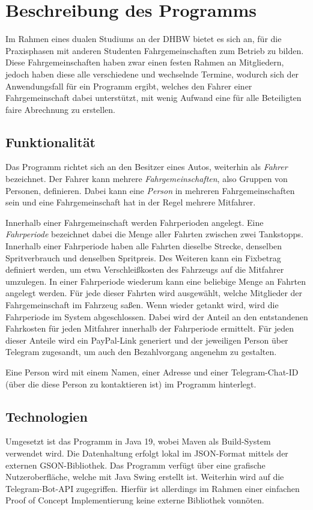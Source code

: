 \chapter{Beschreibung des Programms}
Im Rahmen eines dualen Studiums an der DHBW bietet es sich an, für die Praxisphasen mit anderen Studenten Fahrgemeinschaften zum Betrieb zu bilden.
Diese Fahrgemeinschaften haben zwar einen festen Rahmen an Mitgliedern, jedoch haben diese alle verschiedene und wechselnde Termine, wodurch sich der Anwendungsfall für ein Programm ergibt, welches den Fahrer einer Fahrgemeinschaft dabei unterstützt, mit wenig Aufwand eine für alle Beteiligten faire Abrechnung zu erstellen.

\section{Funktionalität}
\label{sec:funktionalität}
Das Programm richtet sich an den Besitzer eines Autos, weiterhin als \emph{Fahrer} bezeichnet.
Der Fahrer kann mehrere \emph{Fahrgemeinschaften}, also Gruppen von Personen, definieren.
Dabei kann eine \emph{Person} in mehreren Fahrgemeinschaften sein und eine Fahrgemeinschaft hat in der Regel mehrere Mitfahrer.

Innerhalb einer Fahrgemeinschaft werden Fahrperioden angelegt.
Eine \emph{Fahrperiode} bezeichnet dabei die Menge aller Fahrten zwischen zwei Tankstopps.
Innerhalb einer Fahrperiode haben alle Fahrten dieselbe Strecke, denselben Spritverbrauch und denselben Spritpreis.
Des Weiteren kann ein Fixbetrag definiert werden, um etwa Verschleißkosten des Fahrzeugs auf die Mitfahrer umzulegen.
In einer Fahrperiode wiederum kann eine beliebige Menge an Fahrten angelegt werden.
Für jede dieser Fahrten wird ausgewählt, welche Mitglieder der Fahrgemeinschaft im Fahrzeug saßen.
Wenn wieder getankt wird, wird die Fahrperiode im System abgeschlossen.
Dabei wird der Anteil an den entstandenen Fahrkosten für jeden Mitfahrer innerhalb der Fahrperiode ermittelt.
Für jeden dieser Anteile wird ein PayPal-Link generiert und der jeweiligen Person über Telegram zugesandt, um auch den Bezahlvorgang angenehm zu gestalten.

Eine Person wird mit einem Namen, einer Adresse und einer Telegram-Chat-ID (über die diese Person zu kontaktieren ist) im Programm hinterlegt.

\section{Technologien}
Umgesetzt ist das Programm in Java 19, wobei Maven als Build-System verwendet wird.
Die Datenhaltung erfolgt lokal im JSON-Format mittels der externen GSON-Bibliothek.
Das Programm verfügt über eine grafische Nutzeroberfläche, welche mit Java Swing erstellt ist.
Weiterhin wird auf die Telegram-Bot-API zugegriffen.
Hierfür ist allerdings im Rahmen einer einfachen Proof of Concept Implementierung keine externe Bibliothek vonnöten.

